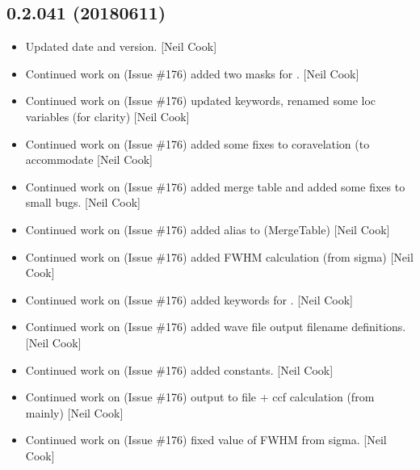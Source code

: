\documentclass[a4paper,10pt,english]{report}
\begin{document}
\subsection{0.2.041 (2018\sphinxhyphen{}06\sphinxhyphen{}11)}
\label{\detokenize{misc/changelog:id442}}\begin{itemize}
\item {} 
Updated date and version. {[}Neil Cook{]}

\item {} 
Continued work on  (Issue \#176) \sphinxhyphen{} added two masks for .
{[}Neil Cook{]}

\item {} 
Continued work on  (Issue \#176) \sphinxhyphen{} updated keywords, renamed some
loc variables (for clarity) {[}Neil Cook{]}

\item {} 
Continued work on  (Issue \#176) \sphinxhyphen{} added some fixes to
coravelation (to accommodate  {[}Neil Cook{]}

\item {} 
Continued work on  (Issue \#176) \sphinxhyphen{} added merge table and added
some fixes to small bugs. {[}Neil Cook{]}

\item {} 
Continued work on  (Issue \#176) \sphinxhyphen{} added alias to
 (MergeTable) {[}Neil Cook{]}

\item {} 
Continued work on  (Issue \#176) \sphinxhyphen{} added FWHM calculation (from
sigma) {[}Neil Cook{]}

\item {} 
Continued work on  (Issue \#176) \sphinxhyphen{} added keywords for .
{[}Neil Cook{]}

\item {} 
Continued work on  (Issue \#176) \sphinxhyphen{} added wave file output
filename definitions. {[}Neil Cook{]}

\item {} 
Continued work on  (Issue \#176) \sphinxhyphen{} added constants. {[}Neil Cook{]}

\item {} 
Continued work on  (Issue \#176) \sphinxhyphen{} output to file + ccf
calculation (from  mainly) {[}Neil Cook{]}

\item {} 
Continued work on  (Issue \#176) \sphinxhyphen{} fixed value of FWHM from
sigma. {[}Neil Cook{]}

\end{itemize}
\end{document}
